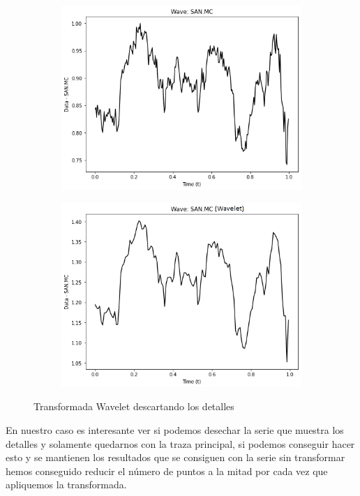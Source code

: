 \documentclass[12pt,a4paper]{article}
\begin{document}
\begin{figure}[H]
\centering
\begin{subfigure}{.5\textwidth}
  \centering
  \includegraphics[width=.9\linewidth]{serie normalizada}
  \label{fig:sub1}
\end{subfigure}%
\begin{subfigure}{.5\textwidth}
  \centering
  \includegraphics[width=.9\linewidth]{serie wavelet}
  \label{fig:sub2}
\end{subfigure}
\caption{Transformada Wavelet descartando los detalles}
\label{fig:test}
\end{figure}
			En nuestro caso es interesante ver si podemos desechar la serie que muestra los detalles y solamente quedarnos con la traza principal, si podemos conseguir hacer esto y se mantienen los resultados que se consiguen con la serie sin transformar hemos conseguido reducir el número de puntos a la mitad por cada vez que apliquemos la transformada.\\
\end{document}
